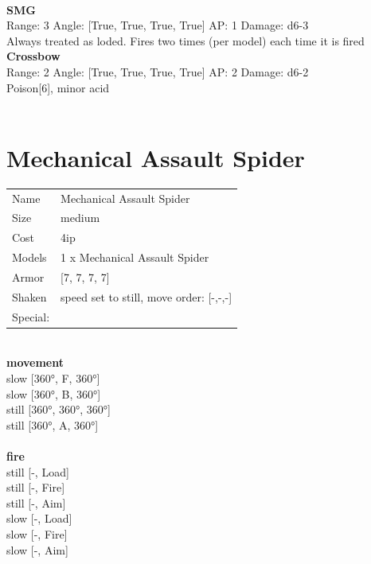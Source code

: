 {\ \\
{\bf SMG } \\



Range: 3  Angle: [True, True, True, True] AP: 1 Damage: d6-3 \\
Always treated as loded. Fires two times (per model) each time it is fired\\ 




{\bf Crossbow } \\



Range: 2  Angle: [True, True, True, True] AP: 2 Damage: d6-2 \\
Poison[6], minor acid\\ 




 
\ \\













\clearpage

\section{ Mechanical Assault Spider }

\begin{tabular}{ll}
  Name & Mechanical Assault Spider \\
  Size & medium\\
  Cost & 4ip\\
  Models & 1 x Mechanical Assault Spider\\
  Armor & [7, 7, 7, 7]\\
  Shaken & speed set to still, move order: [-,-,-]\\
  Special: \\
\end{tabular}

\noindent 

\ \\ {\bf movement } \\
slow [360°, F, 360°] \\
slow [360°, B, 360°] \\
still [360°, 360°, 360°] \\
still [360°, A, 360°] \\
\ \\ {\bf fire } \\
still [-, Load] \\
still [-, Fire] \\
still [-, Aim] \\
slow [-, Load] \\
slow [-, Fire] \\
slow [-, Aim] \\


}
